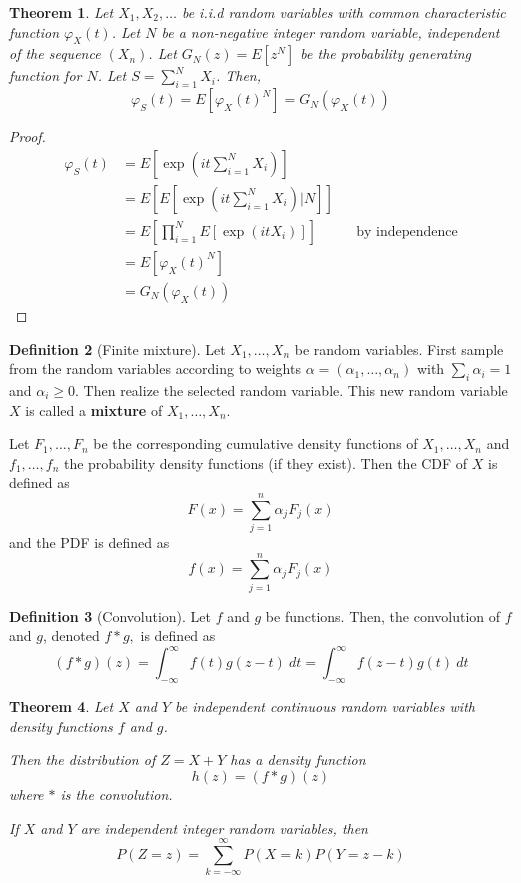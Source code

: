 \documentclass{article}
\theoremstyle{plain}
\newtheorem{theorem}{Theorem}[section]
\theoremstyle{definition}
\newtheorem{defn}[theorem]{Definition}
\theoremstyle{remark}
\numberwithin{equation}{section}
\begin{document}
\begin{theorem}\label{thm:char_func_random_sum}
Let $X_1, X_2, \ldots$ be i.i.d random variables with common characteristic function $\varphi_X(t)$.
Let $N$ be a non-negative integer random variable, independent of the sequence $(X_n)$.
Let $G_N(z) = E[z^N]$ be the probability generating function for $N$.
Let $S = \sum_{i = 1}^N X_i$.
Then,
$$
\varphi_S(t) = E[\varphi_X(t)^N] = G_N(\varphi_X(t))
$$
\end{theorem}

\begin{proof}
\begin{align*}
    \varphi_S(t) &= E[ \exp(it \sum_{i = 1}^N X_i) ]\\
    &= E[ E[ \exp(it \sum_{i = 1}^N X_i) | N ]]\\
    &= E \left[ \prod_{i = 1}^N E[\exp(it X_i)] \right] && \text{by independence}\\
    &= E[\varphi_X(t)^N]\\
    &= G_N(\varphi_X(t))
\end{align*}
\end{proof}

\begin{defn}[Finite mixture]
Let $X_1,\ldots, X_n$ be random variables.
First sample from the random variables according to weights $\alpha = (\alpha_1, \ldots, \alpha_n)$ with $\sum_i \alpha_i = 1$ and $\alpha_i \geq 0$.
Then realize the selected random variable.
This new random variable $X$ is called a \textbf{mixture} of $X_1,\ldots, X_n$.

Let $F_1, \ldots, F_n$ be the corresponding cumulative density functions of $X_1, \ldots, X_n$ and $f_1, \ldots, f_n$ the probability density functions (if they exist).
Then the CDF of $X$ is defined as
$$
F(x) = \sum_{j = 1}^n \alpha_j F_j(x)
$$
and the PDF is defined as
$$
f(x) = \sum_{j = 1}^n \alpha_j F_j(x)
$$
\end{defn}

\begin{defn}[Convolution]
Let $f$ and $g$ be functions. Then, the convolution of $f$ and $g$, denoted $f * g,$ is defined as
$$
(f * g)(z) = \int_{-\infty}^\infty f(t) g(z - t)~dt =  \int_{-\infty}^\infty f(z - t) g(t)~dt
$$
\end{defn}

\begin{theorem}
Let $X$ and $Y$ be independent continuous random variables with density functions $f$ and $g$.

Then the distribution of $Z = X + Y$ has a density function
$$
h(z) = (f * g)(z)
$$
where $*$ is the convolution.

If $X$ and $Y$ are independent integer random variables, then
$$
P(Z = z) = \sum_{k = -\infty}^\infty P(X = k) P(Y = z - k)
$$
\end{theorem}
\end{document}
